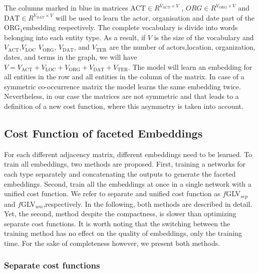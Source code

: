 The columns marked in blue in matrices $\mathrm{ACT}\in R^{V_{\mathrm{ACT}}\times V}$ , $ORG\in R^{V_{\mathrm{ORG}}\times V}$  and $\mathrm{DAT}\in R^{V_{\mathrm{\mathrm{DAT}}}\times V}$ will be used to learn the actor, organisation and date part of the ORG$_1$embedding respectively. The complete vocabulary is divide into words belonging into each entity type. As a result, if $V$ is the size of the vocabulary and $V_{\mathrm{ACT}}$,$V_{\mathrm{LOC}}$ $V_{\mathrm{ORG}}$, $V_{\mathrm{DAT}}$, and $V_{\mathrm{TER}}$  are the number of actors,location, organization, dates, and terms in the graph, we will have $V=V_{\mathrm{ACT}}+V_{\mathrm{LOC}}+V_{\mathrm{ORG}}+V_{\mathrm{DAT}}+V_{\mathrm{TER}}$. The model will learn an embedding for all entities in the row and all entities in the column of the matrix. In case of a symmetric co-occurrence matrix the model learns the same embedding twice. Nevertheless, in our case the matrices are not symmetric and that leads to a definition of a new cost function, where this asymmetry is taken into account.  
\subsection{Cost Function of faceted Embeddings}
\label{sec:faceted_embeddings}
For each different adjacency matrix, different embeddings need to be learned. To train all embeddings, two methods are proposed. First, training a networks for each type separately and concatenating the outputs to generate the faceted embeddings. Second, train all the embeddings at once in a single network with a unified cost function. We refer to separate and unified cost function as $f$GLV$_{sep}$ and $f$GLV$_{uni}$,respectively. In the following, both methods are described in detail. Yet, the second, method despite the compactness, is slower than optimizing separate cost functions. It is worth noting that the switching between the training method has no effect on the quality of embeddings, only the training time. For the sake of completeness however, we present both methods. \\
\subsubsection{Separate cost functions}
\label{sec:normal_cost}

